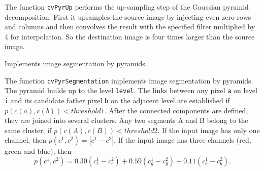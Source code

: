 \begin{description}
\end{description}

The function \texttt{cvPyrUp} performs the up-sampling step of the Gaussian pyramid decomposition. First it upsamples the source image by injecting even zero rows and columns and then convolves the result with the specified filter multiplied by 4 for interpolation. So the destination image is four times larger than the source image.

\label{PyrSegmentation}

Implements image segmentation by pyramids.


\begin{description}
\end{description}

The function \texttt{cvPyrSegmentation} implements image segmentation by pyramids. The pyramid builds up to the level \texttt{level}. The links between any pixel \texttt{a} on level \texttt{i} and its candidate father pixel \texttt{b} on the adjacent level are established if
$p(c(a),c(b))<threshold1$.
After the connected components are defined, they are joined into several clusters.
Any two segments A and B belong to the same cluster, if $p(c(A),c(B))<threshold2$.
If the input image has only one channel, then $p(c^1,c^2)=|c^1-c^2|$.
If the input image has three channels (red, green and blue), then
\[
  p(c^1,c^2) = 0.30 (c^1_r - c^2_r) +
               0.59 (c^1_g - c^2_g) +
               0.11 (c^1_b - c^2_b).
\]

